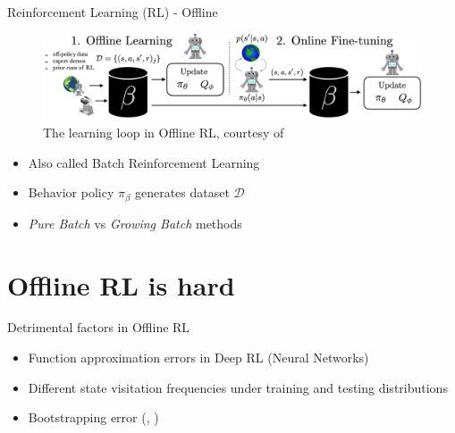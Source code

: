 \documentclass[presentation]{beamer}
\begin{document}
\begin{frame}[label={sec:orgf63bec7}]{Reinforcement Learning (RL) - Offline}
\begin{figure}[htbp]
\centering
\includegraphics[width=\textwidth]{./offline_rl_sketch_2.png}
\caption{\label{fig:org2dc03a4}The learning loop in Offline RL, courtesy of \citeauthor{DBLP:journals/corr/abs-2006-09359}}
\end{figure}

\begin{itemize}
\item Also called Batch Reinforcement Learning
\item Behavior policy \(\pi_{\beta}\) generates dataset \(\mathcal{D}\)
\item \emph{Pure Batch} vs \emph{Growing Batch} methods
\end{itemize}
\end{frame}

\section{Offline RL is hard}
\label{sec:orgd12c9fa}
\begin{frame}[label={sec:org59048a2}]{Detrimental factors in Offline RL}
\begin{itemize}
\item Function approximation errors in Deep RL (Neural Networks)
\end{itemize}

\begin{itemize}
\item Different state visitation frequencies under training and testing
distributions
\end{itemize}

\begin{itemize}
\item \alert{Bootstrapping error} (\citeauthor{kumar2019stabilizing},
\citeyear{kumar2019stabilizing})
\end{itemize}
\end{frame}
\end{document}
